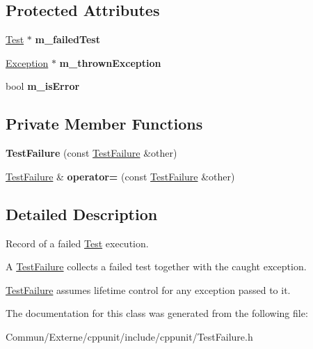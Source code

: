 \subsection*{Protected Attributes}
\begin{DoxyCompactItemize}
\item 
\hyperlink{class_test}{Test} $\ast$ {\bfseries m\+\_\+failed\+Test}\hypertarget{class_test_failure_a2ba79089909967b45aedc4992b51553a}{}\label{class_test_failure_a2ba79089909967b45aedc4992b51553a}

\item 
\hyperlink{class_exception}{Exception} $\ast$ {\bfseries m\+\_\+thrown\+Exception}\hypertarget{class_test_failure_a96bfae3c1f32d0c1729501d68016f431}{}\label{class_test_failure_a96bfae3c1f32d0c1729501d68016f431}

\item 
bool {\bfseries m\+\_\+is\+Error}\hypertarget{class_test_failure_abf258e5bec289b51fb13147a62b8b75d}{}\label{class_test_failure_abf258e5bec289b51fb13147a62b8b75d}

\end{DoxyCompactItemize}
\subsection*{Private Member Functions}
\begin{DoxyCompactItemize}
\item 
{\bfseries Test\+Failure} (const \hyperlink{class_test_failure}{Test\+Failure} \&other)\hypertarget{class_test_failure_aeef404204f8114c31bb5d3049b22acab}{}\label{class_test_failure_aeef404204f8114c31bb5d3049b22acab}

\item 
\hyperlink{class_test_failure}{Test\+Failure} \& {\bfseries operator=} (const \hyperlink{class_test_failure}{Test\+Failure} \&other)\hypertarget{class_test_failure_aa9eef2b8d4177f6b59e818810dc28b66}{}\label{class_test_failure_aa9eef2b8d4177f6b59e818810dc28b66}

\end{DoxyCompactItemize}


\subsection{Detailed Description}
Record of a failed \hyperlink{class_test}{Test} execution.

A \hyperlink{class_test_failure}{Test\+Failure} collects a failed test together with the caught exception. 

\hyperlink{class_test_failure}{Test\+Failure} assumes lifetime control for any exception passed to it. 

The documentation for this class was generated from the following file\+:\begin{DoxyCompactItemize}
\item 
Commun/\+Externe/cppunit/include/cppunit/Test\+Failure.\+h\end{DoxyCompactItemize}
